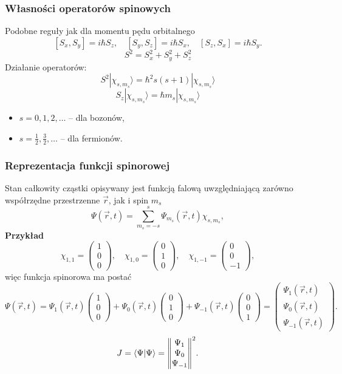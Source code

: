 \subsubsection*{Własności operatorów spinowych}
Podobne reguły jak dla momentu pędu orbitalnego
$$
[S_x, S_y] = i \hbar S_z, \quad [S_y, S_z] = i \hbar S_x, \quad [S_z, S_x] = i \hbar S_y.
$$
$$
S^2 = S_x^2 + S_y^2 + S_z^2
$$
Działanie operatorów:
$$
S^2 | \chi_{s, m_s} \rangle = \hbar^2 s(s+1) | \chi_{s, m_s} \rangle
$$
$$
S_z | \chi_{s, m_s} \rangle = \hbar m_s | \chi_{s, m_s} \rangle
$$
\begin{itemize}
\item $s = 0, 1, 2, \dots$ -- dla bozonów,
\item $s = \frac{1}{2}, \frac{3}{2}, \dots$ -- dla fermionów.
\end{itemize}

\subsubsection*{Reprezentacja funkcji spinorowej}
Stan całkowity cząstki opisywany jest funkcją falową uwzględniającą zarówno współrzędne przestrzenne $\vec{r}$, jak i spin $m_s$
$$
\Psi(\vec{r}, t) = \sum_{m_s = -s}^{s} \Psi_{m_s}(\vec{r}, t) \chi_{s, m_s},
$$
\textbf{Przykład}
$$
\chi_{1, 1} = \begin{pmatrix} 1 \\ 0 \\ 0 \end{pmatrix}, \quad
\chi_{1, 0} = \begin{pmatrix} 0 \\ 1 \\ 0 \end{pmatrix}, \quad
\chi_{1, -1} = \begin{pmatrix} 0 \\ 0 \\ -1 \end{pmatrix},
$$
więc funkcja spinorowa ma postać
$$
\Psi(\vec{r}, t) = \Psi_{1}(\vec{r}, t) \begin{pmatrix} 1 \\ 0 \\ 0 \end{pmatrix}
+ \Psi_{0}(\vec{r}, t) \begin{pmatrix} 0 \\ 1 \\ 0 \end{pmatrix}
+ \Psi_{-1}(\vec{r}, t) \begin{pmatrix} 0 \\ 0 \\ 1 \end{pmatrix}
= \begin{pmatrix}
\Psi_1(\vec{r}, t) \\
\Psi_0(\vec{r}, t) \\
\Psi_{-1}(\vec{r}, t)
\end{pmatrix}.
$$
$$
J=\langle \Psi | \Psi \rangle = \norm{\begin{matrix}
\Psi_1 \\
\Psi_0 \\
\Psi_{-1}
\end{matrix}}^2.
$$

